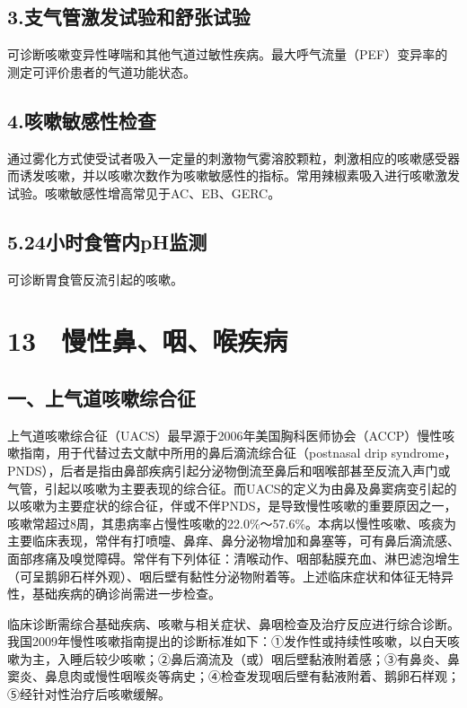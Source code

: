 \subsection{3.支气管激发试验和舒张试验}

可诊断咳嗽变异性哮喘和其他气道过敏性疾病。最大呼气流量（PEF）变异率的测定可评价患者的气道功能状态。

\subsection{4.咳嗽敏感性检查}

通过雾化方式使受试者吸入一定量的刺激物气雾溶胶颗粒，刺激相应的咳嗽感受器而诱发咳嗽，并以咳嗽次数作为咳嗽敏感性的指标。常用辣椒素吸入进行咳嗽激发试验。咳嗽敏感性增高常见于AC、EB、GERC。

\subsection{5.24小时食管内pH监测}

可诊断胃食管反流引起的咳嗽。

\protect\hypertarget{text00063.html}{}{}

\section{13　慢性鼻、咽、喉疾病}

\subsection{一、上气道咳嗽综合征}

上气道咳嗽综合征（UACS）最早源于2006年美国胸科医师协会（ACCP）慢性咳嗽指南，用于代替过去文献中所用的鼻后滴流综合征（postnasal
drip
syndrome，PNDS），后者是指由鼻部疾病引起分泌物倒流至鼻后和咽喉部甚至反流入声门或气管，引起以咳嗽为主要表现的综合征。而UACS的定义为由鼻及鼻窦病变引起的以咳嗽为主要症状的综合征，伴或不伴PNDS，是导致慢性咳嗽的重要原因之一，咳嗽常超过8周，其患病率占慢性咳嗽的22.0\%～57.6\%。本病以慢性咳嗽、咳痰为主要临床表现，常伴有打喷嚏、鼻痒、鼻分泌物增加和鼻塞等，可有鼻后滴流感、面部疼痛及嗅觉障碍。常伴有下列体征：清喉动作、咽部黏膜充血、淋巴滤泡增生（可呈鹅卵石样外观）、咽后壁有黏性分泌物附着等。上述临床症状和体征无特异性，基础疾病的确诊尚需进一步检查。

临床诊断需综合基础疾病、咳嗽与相关症状、鼻咽检查及治疗反应进行综合诊断。我国2009年慢性咳嗽指南提出的诊断标准如下：①发作性或持续性咳嗽，以白天咳嗽为主，入睡后较少咳嗽；②鼻后滴流及（或）咽后壁黏液附着感；③有鼻炎、鼻窦炎、鼻息肉或慢性咽喉炎等病史；④检查发现咽后壁有黏液附着、鹅卵石样观；⑤经针对性治疗后咳嗽缓解。

